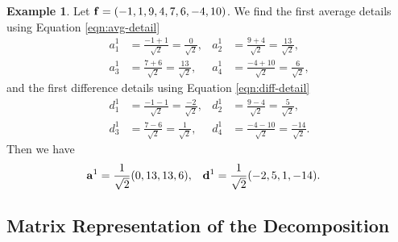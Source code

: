 \documentclass[12pt]{article}
\theoremstyle{definition}
\newtheorem{example}[definition]{Example}
\begin{document}
  \begin{example} \label{eg:decomp-1}
      Let \(\vb{f} = (-1, 1, 9, 4, 7, 6, -4, 10)\). We find the first average details using Equation \eqref{eqn:avg-detail}
      \begin{align*}
      a_1^1 &= \frac{-1+1}{\sqrt{2}} = \frac{0}{\sqrt{2}}, &
      a_2^1 &= \frac{9+4}{\sqrt{2}} = \frac{13}{\sqrt{2}},\\
      a_3^1 &= \frac{7+6}{\sqrt{2}} = \frac{13}{\sqrt{2}}, &
      a_4^1 &= \frac{-4+10}{\sqrt{2}} = \frac{6}{\sqrt{2}},
    \end{align*}
    and the first difference details using Equation \eqref{eqn:diff-detail}
    \begin{align*}
      d_1^1 &= \frac{-1-1}{\sqrt{2}} = \frac{-2}{\sqrt{2}}, &
      d_2^1 &= \frac{9-4}{\sqrt{2}} = \frac{5}{\sqrt{2}},\\
      d_3^1 &= \frac{7-6}{\sqrt{2}} = \frac{1}{\sqrt{2}}, &
      d_4^1 &= \frac{-4-10}{\sqrt{2}} = \frac{-14}{\sqrt{2}}.
    \end{align*}
    Then we have
    \begin{align*}
      \vb{a}^1 &= \frac{1}{\sqrt{2}}(0,13,13,6), &
      \vb{d}^1 &= \frac{1}{\sqrt{2}}(-2,5,1,-14).
    \end{align*}
  \end{example}

  \subsection{Matrix Representation of the Decomposition}
\end{document}
